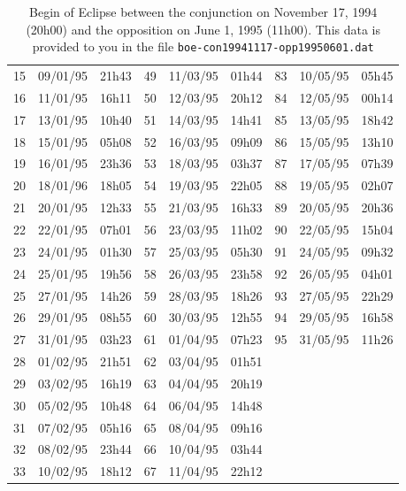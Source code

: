 \documentclass{tufte-handout}
\begin{document}
\begin{table}
\begin{tabular}{lll|lll|lll}
15 & 09/01/95 & 21h43 & 49 & 11/03/95 & 01h44 & 83 & 10/05/95 & 05h45 \\
16 & 11/01/95 & 16h11 & 50 & 12/03/95 & 20h12 & 84 & 12/05/95 & 00h14 \\
17 & 13/01/95 & 10h40 & 51 & 14/03/95 & 14h41 & 85 & 13/05/95 & 18h42 \\
18 & 15/01/95 & 05h08 & 52 & 16/03/95 & 09h09 & 86 & 15/05/95 & 13h10 \\
19 & 16/01/95 & 23h36 & 53 & 18/03/95 & 03h37 & 87 & 17/05/95 & 07h39 \\
20 & 18/01/96 & 18h05 & 54 & 19/03/95 & 22h05 & 88 & 19/05/95 & 02h07 \\
21 & 20/01/95 & 12h33 & 55 & 21/03/95 & 16h33 & 89 & 20/05/95 & 20h36 \\
22 & 22/01/95 & 07h01 & 56 & 23/03/95 & 11h02 & 90 & 22/05/95 & 15h04 \\
23 & 24/01/95 & 01h30 & 57 & 25/03/95 & 05h30 & 91 & 24/05/95 & 09h32 \\
24 & 25/01/95 & 19h56 & 58 & 26/03/95 & 23h58 & 92 & 26/05/95 & 04h01 \\
25 & 27/01/95 & 14h26 & 59 & 28/03/95 & 18h26 & 93 & 27/05/95 & 22h29 \\
26 & 29/01/95 & 08h55 & 60 & 30/03/95 & 12h55 & 94 & 29/05/95 & 16h58 \\
27 & 31/01/95 & 03h23 & 61 & 01/04/95 & 07h23 & 95 & 31/05/95 & 11h26 \\
28 & 01/02/95 & 21h51 & 62 & 03/04/95 & 01h51 &  & & \\
29 & 03/02/95 & 16h19 & 63 & 04/04/95 & 20h19 &  & & \\
30 & 05/02/95 & 10h48 & 64 & 06/04/95 & 14h48 &  & & \\
31 & 07/02/95 & 05h16 & 65 & 08/04/95 & 09h16 &  & & \\
32 & 08/02/95 & 23h44 & 66 & 10/04/95 & 03h44 &  & & \\
33 & 10/02/95 & 18h12 & 67 & 11/04/95 & 22h12 &  & & \\
\end{tabular}
\caption{ Begin of Eclipse between the conjunction on November 17, 1994 (20h00) and the opposition on June 1, 1995 (11h00). This data is provided to you in the file {\tt boe-con19941117-opp19950601.dat}}
\end{table}
\end{document}
